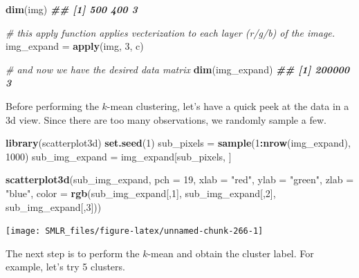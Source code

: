 \documentclass[
]{book}
\newenvironment{Shaded}{\begin{snugshade}}{\end{snugshade}}
\newcommand{\AttributeTok}[1]{\textcolor[rgb]{0.13,0.29,0.53}{#1}}
\newcommand{\CommentTok}[1]{\textcolor[rgb]{0.56,0.35,0.01}{\textit{#1}}}
\newcommand{\DecValTok}[1]{\textcolor[rgb]{0.00,0.00,0.81}{#1}}
\newcommand{\DocumentationTok}[1]{\textcolor[rgb]{0.56,0.35,0.01}{\textbf{\textit{#1}}}}
\newcommand{\FunctionTok}[1]{\textcolor[rgb]{0.13,0.29,0.53}{\textbf{#1}}}
\newcommand{\NormalTok}[1]{#1}
\newcommand{\OtherTok}[1]{\textcolor[rgb]{0.56,0.35,0.01}{#1}}
\newcommand{\SpecialCharTok}[1]{\textcolor[rgb]{0.81,0.36,0.00}{\textbf{#1}}}
\newcommand{\StringTok}[1]{\textcolor[rgb]{0.31,0.60,0.02}{#1}}
\theoremstyle{definition}
\theoremstyle{definition}
\theoremstyle{definition}
\theoremstyle{definition}
\theoremstyle{remark}
\begin{document}
\begin{Shaded}
\begin{Highlighting}[]
    \FunctionTok{dim}\NormalTok{(img)}
\DocumentationTok{\#\# [1] 500 400   3}
    
    \CommentTok{\# this apply function applies vecterization to each layer (r/g/b) of the image. }
\NormalTok{    img\_expand }\OtherTok{=} \FunctionTok{apply}\NormalTok{(img, }\DecValTok{3}\NormalTok{, c)}

    \CommentTok{\# and now we have the desired data matrix}
    \FunctionTok{dim}\NormalTok{(img\_expand)}
\DocumentationTok{\#\# [1] 200000      3}
\end{Highlighting}
\end{Shaded}

Before performing the \(k\)-mean clustering, let's have a quick peek at the data in a 3d view. Since there are too many observations, we randomly sample a few.

\begin{Shaded}
\begin{Highlighting}[]
    \FunctionTok{library}\NormalTok{(scatterplot3d)}
    \FunctionTok{set.seed}\NormalTok{(}\DecValTok{1}\NormalTok{)}
\NormalTok{    sub\_pixels }\OtherTok{=} \FunctionTok{sample}\NormalTok{(}\DecValTok{1}\SpecialCharTok{:}\FunctionTok{nrow}\NormalTok{(img\_expand), }\DecValTok{1000}\NormalTok{)}
\NormalTok{    sub\_img\_expand }\OtherTok{=}\NormalTok{ img\_expand[sub\_pixels, ]}
    
    \FunctionTok{scatterplot3d}\NormalTok{(sub\_img\_expand, }\AttributeTok{pch =} \DecValTok{19}\NormalTok{, }
                  \AttributeTok{xlab =} \StringTok{"red"}\NormalTok{, }\AttributeTok{ylab =} \StringTok{"green"}\NormalTok{, }\AttributeTok{zlab =} \StringTok{"blue"}\NormalTok{, }
                  \AttributeTok{color =} \FunctionTok{rgb}\NormalTok{(sub\_img\_expand[,}\DecValTok{1}\NormalTok{], sub\_img\_expand[,}\DecValTok{2}\NormalTok{],}
\NormalTok{                              sub\_img\_expand[,}\DecValTok{3}\NormalTok{]))}
\end{Highlighting}
\end{Shaded}

\begin{center}\texttt{[image: SMLR\_files/figure-latex/unnamed-chunk-266-1]} \end{center}

The next step is to perform the \(k\)-mean and obtain the cluster label. For example, let's try 5 clusters.
\end{document}
